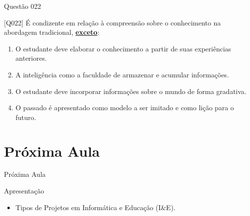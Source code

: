 \documentclass[xcolor=dvipsnames,table]{beamer}
\begin{document}
    \begin{frame}{Questão 022}
		\begin{block}{[Q022]}
		 É condizente em relação à compreensão sobre o conhecimento na abordagem tradicional, \underline{\bf exceto}:
		\end{block}
		\begin{enumerate}[label=(\Alph*)]
			\item O estudante deve elaborar o conhecimento a partir de suas experiências anteriores.
			\item A inteligência como a faculdade de armazenar e acumular informações.
			\item O estudante deve incorporar informações sobre o mundo de forma gradativa.
			\item O passado é apresentado como modelo a ser imitado e como lição para o futuro.
		\end{enumerate}
	\end{frame}

\section{Próxima Aula}
\begin{frame}{Próxima Aula}
    \begin{block}{Apresentação}
        \begin{itemize}
            \item Tipos de Projetos em Informática e Educação (I\&E).  
        \end{itemize}
    \end{block}
\end{frame}
	
	\begin{frame}
		\titlepage
	\end{frame}
	
\end{document}
